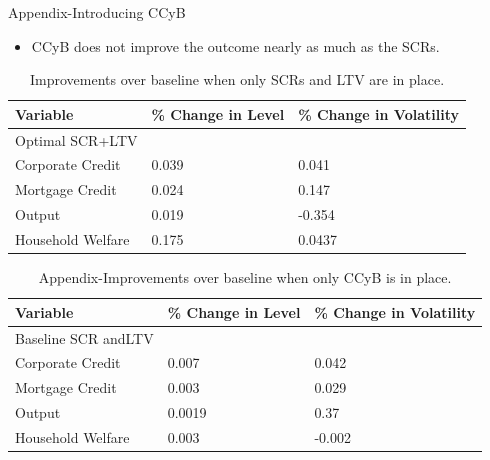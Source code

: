 \documentclass[8pt,aspectratio=169]{beamer}
\numberwithin{equation}{section}
\begin{document}
\begin{frame}{Appendix-Introducing CCyB}

\begin{itemize}
\item CCyB does not improve the outcome nearly as much as the SCRs.

\end{itemize}


\begin{table}[h]
\caption{Improvements over baseline when only SCRs and LTV are in place.}
\begin{tabular}{l|l|l}
\small
Variable & \% Change in Level & \% Change in Volatility \\
\hline
Optimal SCR+LTV & & \\
\hline
    Corporate Credit           &       0.039    &      0.041 \\
    Mortgage Credit            &      0.024    &       0.147 \\
    Output         &     0.019    &    -0.354 \\ 
    Household Welfare       &     0.175     &     0.0437\\
\end{tabular}
\end{table}



\begin{table}[h]
\caption{Appendix-Improvements over baseline when only CCyB is in place. }
\begin{tabular}{l|l|l}
\small
Variable & \% Change in Level & \% Change in Volatility \\
\hline
Baseline SCR andLTV & & \\
\hline
    Corporate Credit           &       0.007    &      0.042 \\
    Mortgage Credit            &      0.003    &       0.029 \\
    Output         &     0.0019    &    0.37 \\ 
    Household Welfare       &     0.003     &     -0.002\\
  

  \end{tabular}
\end{table}


\end{frame}
\end{document}

